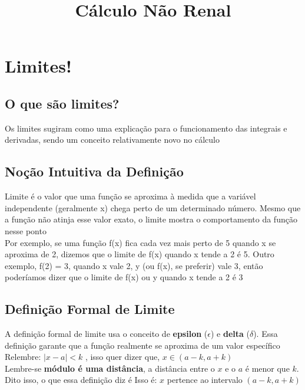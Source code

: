 \documentclass{article}
\title{Cálculo Não Renal}
\begin{document}
\maketitle

\section{Limites!}

\subsection{O que são limites?}
Os limites sugiram como uma explicação para o funcionamento das integrais e derivadas, sendo um conceito relativamente novo no cálculo
\subsection{Noção Intuitiva da Definição}
Limite é o valor que uma função se aproxima à medida que a variável independente (geralmente x) chega perto de um determinado número. Mesmo que a função não atinja esse valor exato, o limite mostra o comportamento da função nesse ponto\\[10pt]
Por exemplo, se uma função f(x) fica cada vez mais perto de 5 quando
x se aproxima de 2, dizemos que o limite de f(x) quando x tende a 2 é 5. Outro exemplo, f(2) = 3, quando x vale 2, y (ou f(x), se preferir) vale 3, então poderíamos dizer que o limite de f(x) ou y quando x tende a 2 é 3

\subsection{Definição Formal de Limite}
A definição formal de limite usa o conceito de \textbf{epsilon} (\(\epsilon\)) e \textbf{delta} (\(\delta\)). Essa definição garante que a função realmente se aproxima de um valor específico
\\
Relembre: $|x - a| < k$ , isso quer dizer que, $x \in (a - k, a + k)$\\[10pt]
Lembre-se \textbf{módulo é uma distância}, a distância entre o $x$ e o $a$ é menor que $k$. Dito isso, o que essa definição diz é Isso é: $x$ pertence ao intervalo $(a - k, a + k)$
\end{document}
